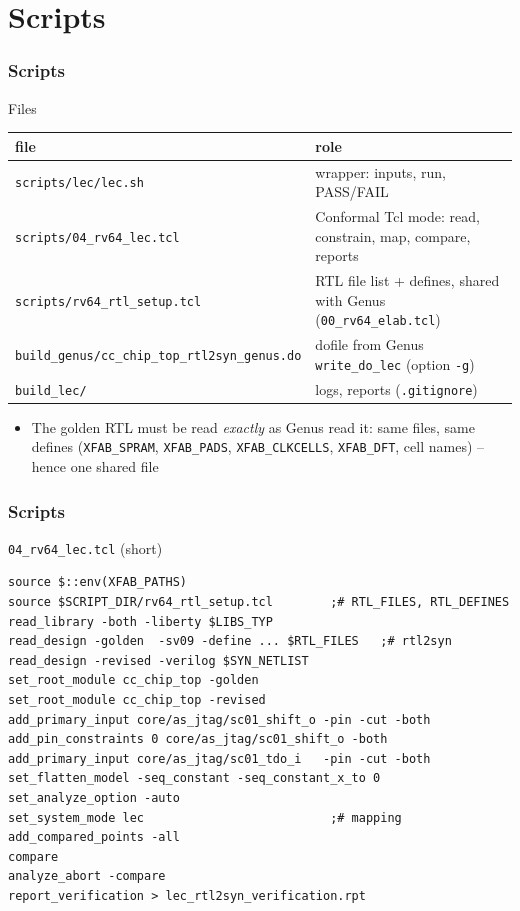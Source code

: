 \documentclass{beamer}
\newcommand{\astitle}{nix}
\newcommand{\assubtitle}{nix}
\newcommand{\cmd}[1]{\texttt{#1}}
\begin{document}
\section{Scripts}
\renewcommand{\astitle}{Scripts}

\renewcommand{\assubtitle}{Files}
\begin{frame}
\frametitle{\astitle}
\begin{block}{\assubtitle}
  \footnotesize
  \begin{tabularx}{\linewidth}{@{}lY@{}}
    \textbf{file} & \textbf{role}\\\hline
    \cmd{scripts/lec/lec.sh}        & wrapper: inputs, run, PASS/FAIL\\
    \cmd{scripts/04\_rv64\_lec.tcl} & Conformal Tcl mode: read, constrain,
                                      map, compare, reports\\
    \cmd{scripts/rv64\_rtl\_setup.tcl} & RTL file list + defines, shared
                                      with Genus (\cmd{00\_rv64\_elab.tcl})\\
    \cmd{build\_genus/cc\_chip\_top\_rtl2syn\_genus.do} & dofile from
                                      Genus \cmd{write\_do\_lec} (option
                                      \cmd{-g})\\
    \cmd{build\_lec/}               & logs, reports (\cmd{.gitignore})\\
  \end{tabularx}
  \vspace{4pt}
  \begin{itemize}
    \item The golden RTL must be read \emph{exactly} as Genus read it:
      same files, same defines (\cmd{XFAB\_SPRAM}, \cmd{XFAB\_PADS},
      \cmd{XFAB\_CLKCELLS}, \cmd{XFAB\_DFT}, cell names) -- hence one
      shared file
  \end{itemize}
\end{block}
\end{frame}

\renewcommand{\assubtitle}{\texttt{04\_rv64\_lec.tcl} (short)}
\begin{frame}[fragile]
\frametitle{\astitle}
\begin{block}{\assubtitle}
\begin{lstlisting}[style=sh]
source $::env(XFAB_PATHS)
source $SCRIPT_DIR/rv64_rtl_setup.tcl        ;# RTL_FILES, RTL_DEFINES
read_library -both -liberty $LIBS_TYP
read_design -golden  -sv09 -define ... $RTL_FILES   ;# rtl2syn
read_design -revised -verilog $SYN_NETLIST
set_root_module cc_chip_top -golden
set_root_module cc_chip_top -revised
add_primary_input core/as_jtag/sc01_shift_o -pin -cut -both
add_pin_constraints 0 core/as_jtag/sc01_shift_o -both
add_primary_input core/as_jtag/sc01_tdo_i   -pin -cut -both
set_flatten_model -seq_constant -seq_constant_x_to 0
set_analyze_option -auto
set_system_mode lec                          ;# mapping
add_compared_points -all
compare
analyze_abort -compare
report_verification > lec_rtl2syn_verification.rpt
\end{lstlisting}
\end{block}
\end{frame}
\end{document}

